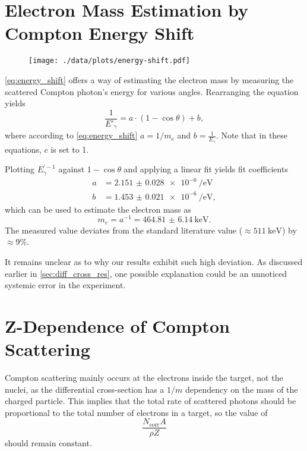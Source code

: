 \section{Electron Mass Estimation by Compton Energy Shift}
\begin{figure}
	\centering
	\texttt{[image: ./data/plots/energy-shift.pdf]}
	\label{fig:energy_shift}
\end{figure}

\autoref{eq:energy_shift} offers a way of estimating the electron mass by measuring the scattered Compton photon's energy for various angles.
Rearranging the equation yields
\begin{equation*}
	\frac{1}{E'_\gamma} = a\cdot\left(1-\cos\theta\right) + b,
\end{equation*}
where according to \autoref{eq:energy_shift} $a=1/m_e$ and $b=\frac{1}{E_\gamma}$.
Note that in these equations, $c$ is set to 1.

Plotting $E_\gamma^{'-1}$ against $1-\cos\theta$ and applying a linear fit yields fit coefficients
\begin{align*}
	a &= \SI{2.151(28)e-6}{\per\eV} \\
	b &= \SI{1.453(21)e-6}{\per\eV},
\end{align*}
which can be used to estimate the electron mass as
\begin{equation*}
	m_e = a^{-1} = \SI{464.81(614)}{\keV}.
\end{equation*}
The measured value deviates from the standard literature value \cite{pdg} ($\approx\SI{511}{\keV}$) by $\approx 9\%$.

It remains unclear as to why our results exhibit such high deviation.
As discussed earlier in \autoref{sec:diff_cross_res}, one possible explanation could be an unnoticed systemic error in the experiment.

\section{Z-Dependence of Compton Scattering} %
Compton scattering mainly occurs at the electrons inside the target, not the nuclei, as the differential cross-section has a $1/m$ dependency on the mass of the charged particle.
This implies that the total rate of scattered photons should be proportional to the total number of electrons in a target, so the value of
\begin{equation}\label{eq_const-stuff}
	\frac{N_\text{corr} A}{\rho Z}
\end{equation}
should remain constant.


